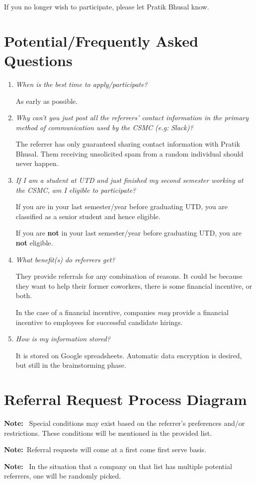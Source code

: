 \documentclass[letterpaper, 12pt]{article}
\newcommand{\QA}[2]{\textit{#1}\medskip

    #2\bigskip
}
\newcommand{\note}[1]{\textbf{Note:}~#1}
\begin{document}
If you no longer wish to participate, please let Pratik Bhusal know.

\section{Potential/Frequently Asked Questions}

\begin{enumerate}[leftmargin=*]
    \item\QA%
        {When is the best time to apply/participate?}
        {As early as possible.}
    \item\QA%
        {%
            Why can't you just post all the referrers' contact information in
            the primary method of communication used by the CSMC (e.g: Slack)?
        }
        {%
            The referrer has only guaranteed sharing contact information with
            Pratik Bhusal. Them receiving unsolicited spam from a random
            individual should never happen.
        }
    \item\QA%
        {%
            If I am a student at UTD and just finished my second semester
            working at the CSMC, am I eligible to participate?
        }
        {%
            If you are in your last semester/year before graduating UTD, you are
            classified as a senior student and hence eligible.

            If you are \textbf{not} in your last semester/year before graduating
            UTD, you are \textbf{not} eligible.
        }
    \item\QA%
        {%
            What benefit(s) do referrers get?
        }
        {%
            They provide referrals for any combination of reasons. It could be
            because they want to help their former coworkers, there is some
            financial incentive, or both.

            In the case of a financial incentive, companies \textit{may} provide
            a financial incentive to employees for successful candidate hirings.
        }
    \item\QA%
        {How is my information stored?}
        {
            It is stored on Google spreadsheets. Automatic data encryption is
            desired, but still in the brainstorming phase.
        }
\end{enumerate}


\section{Referral Request Process Diagram}

\label{fig:requestProcess}

\note{%
    Special conditions may exist based on the referrer's preferences and/or
    restrictions. These conditions will be mentioned in the provided list.
}

\note{Referral requests will come at a first come first serve basis.}

\note{%
    In the situation that a company on that list has multiple potential
    referrers, one will be randomly picked.
}
\end{document}
